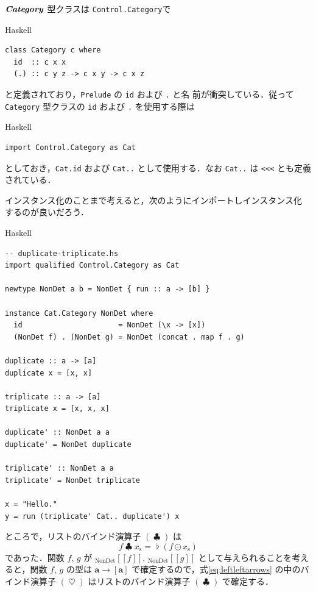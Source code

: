 \documentclass[a5paper,twoside,fleqn,draft]{jsbook}
\def\[{[\![}
\def\]{]\!]}
\newcommand{\programminglanguage}[1]{\textsf{#1}}
\newcommand{\haskell}{\programminglanguage{Haskell}}
\newcommand{\code}[1]{\texttt{#1}}
\newcommand{\filename}[1]{\texttt{#1}}
\newenvironment{haskellcode}{\begin{itembox}[r]{\haskell}}{\end{itembox}}
\DeclareMathOperator{\mBind}{\heartsuit}
\DeclareMathOperator{\mBindList}{\clubsuit}
\DeclareMathOperator{\mFuncArrow}{\rightarrow}
\DeclareMathOperator{\mJoinList}{\flat} %
\DeclareMathOperator{\mMapList}{\odot}
\newcommand{\mType}[1]{\mathbf{#1}} %
\newcommand{\mA}{\mType{a}}
\newcommand{\mValueConstructor}[1]{\mathrm{#1}}
\newcommand{\mValueWith}[2]{{}_\mValueConstructor{#1}\[#2\]}
\newcommand{\mTypeClass}[1]{\textbf{\textit{#1}}}
\newcommand{\mCatTypeClass}{\mTypeClass{Category}}
\newcommand{\mList}[1]{{#1}_\mathrm{s}}
\begin{document}
$\mCatTypeClass$ 型クラスは \filename{Control.Category}で
\begin{haskellcode}
\begin{verbatim}
class Category c where
  id  :: c x x
  (.) :: c y z -> c x y -> c x z
\end{verbatim}
\end{haskellcode}
と定義されており，\filename{Prelude} の \code{id} および \code{.} と名
前が衝突している．従って \code{Category} 型クラスの \code{id} および
\code{.} を使用する際は
\begin{haskellcode}
\begin{verbatim}
import Control.Category as Cat
\end{verbatim}
\end{haskellcode}
としておき，\code{Cat.id} および \code{Cat..} として使用する．なお
\code{Cat..} は \code{<<<} とも定義されている．

インスタンス化のことまで考えると，次のようにインポートしインスタンス化
するのが良いだろう．
\begin{haskellcode}
\begin{verbatim}
-- duplicate-triplicate.hs
import qualified Control.Category as Cat

newtype NonDet a b = NonDet { run :: a -> [b] }

instance Cat.Category NonDet where
  id                      = NonDet (\x -> [x])
  (NonDet f) . (NonDet g) = NonDet (concat . map f . g)

duplicate :: a -> [a]
duplicate x = [x, x]

triplicate :: a -> [a]
triplicate x = [x, x, x]

duplicate' :: NonDet a a
duplicate' = NonDet duplicate

triplicate' :: NonDet a a
triplicate' = NonDet triplicate

x = "Hello."
y = run (triplicate' Cat.. duplicate') x
\end{verbatim}
\end{haskellcode}

ところで，リストのバインド演算子 $(\mBindList)$ は
\begin{equation}
  f\mBindList\mList{x}
  =\mJoinList{}(f\mMapList\mList{x})
  \label{eq:leftleftarrows}
\end{equation}
であった．関数 $f$, $g$ が $\mValueWith{NonDet}{f}$,
$\mValueWith{NonDet}{g}$ として与えられることを考えると，関数 $f$, $g$
の型は $\mA\mFuncArrow[\mA]$ で確定するので，式\eqref{eq:leftleftarrows}
の中のバインド演算子 $(\mBind)$ はリストのバインド演算子
$(\mBindList)$ で確定する．
\end{document}
